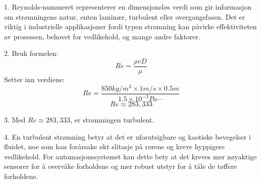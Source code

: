 













1. Reynolds-nummeret representerer en dimensjonsløs verdi som gir informasjon om strømningens natur, enten laminær, turbulent eller overgangsfasen. Det er viktig i industrielle applikasjoner fordi typen strømning kan påvirke effektiviteten av prosessen, behovet for vedlikehold, og mange andre faktorer.

2. Bruk formelen:
\[ Re = \frac{\rho v D}{\mu} \]
Setter inn verdiene:
\[ Re = \frac{850 kg/m^3 \times 1 m/s \times 0.5 m}{1.5 \times 10^{-3}  Pa\cdots} \]
\[ Re \approx 283,333 \]

3. Med \(Re \approx 283,333\), er strømningen turbulent.

4. En turbulent strømning betyr at det er uforutsigbare og kaotiske bevegelser i fluidet, noe som kan forårsake økt slitasje på rørene og kreve hyppigere vedlikehold. For automasjonssystemet kan dette bety at det kreves mer nøyaktige sensorer for å overvåke forholdene og mer robust utstyr for å tåle de tøffere forholdene.







